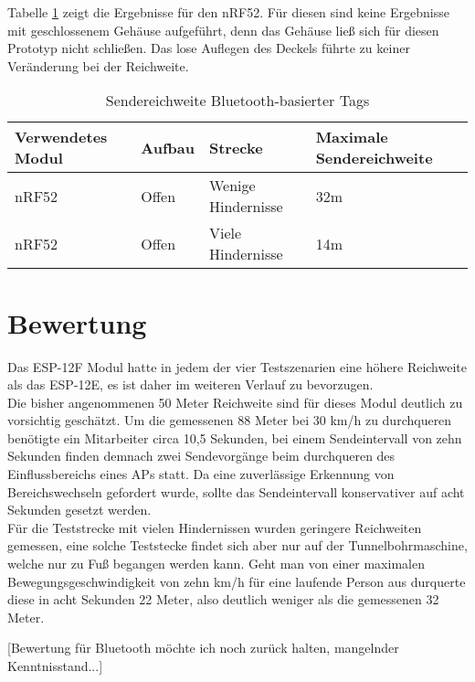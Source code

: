 Tabelle \ref{table:rangeblue} zeigt die Ergebnisse für den nRF52.
Für diesen sind keine Ergebnisse mit geschlossenem Gehäuse aufgeführt, denn das Gehäuse ließ sich für diesen Prototyp nicht schließen.
Das lose Auflegen des Deckels führte zu keiner Veränderung bei der Reichweite.

\begin{table}[h]
	\centering
	\caption{Sendereichweite Bluetooth-basierter Tags}
	\label{table:rangeblue}
	\begin{tabular}{p{3.5cm}|p{3cm}|p{3.5cm}|p{3cm}}
		Verwendetes Modul & Aufbau & Strecke & Maximale Sendereichweite \\
		\hline
		nRF52 & Offen & Wenige Hindernisse & 32m \\
		nRF52 & Offen & Viele Hindernisse & 14m \\
	\end{tabular}
\end{table}

\section{Bewertung}
Das ESP-12F Modul hatte in jedem der vier Testszenarien eine höhere Reichweite als das ESP-12E, es ist daher im weiteren Verlauf zu bevorzugen.\\
Die bisher angenommenen 50 Meter Reichweite sind für dieses Modul deutlich zu vorsichtig geschätzt. 
Um die gemessenen 88 Meter bei 30 km/h zu durchqueren benötigte ein Mitarbeiter circa 10,5 Sekunden, bei einem Sendeintervall von zehn Sekunden finden demnach zwei Sendevorgänge beim durchqueren des Einflussbereichs eines APs statt.
Da eine zuverlässige Erkennung von Bereichswechseln gefordert wurde, sollte das Sendeintervall konservativer auf acht Sekunden gesetzt werden.\\
Für die Teststrecke mit vielen Hindernissen wurden geringere Reichweiten gemessen, eine solche Teststecke findet sich aber nur auf der Tunnelbohrmaschine, welche nur zu Fuß begangen werden kann. 
Geht man von einer maximalen Bewegungsgeschwindigkeit von zehn km/h für eine laufende Person aus durquerte diese in acht Sekunden 22 Meter, also deutlich weniger als die gemessenen 32 Meter.

[Bewertung für Bluetooth möchte ich noch zurück halten, mangelnder Kenntnisstand...]
